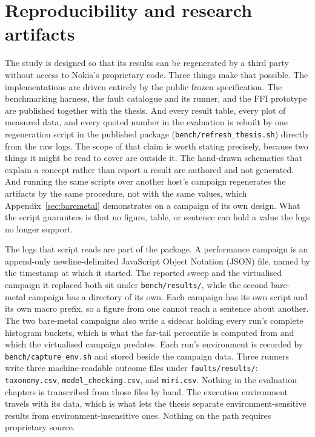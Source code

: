 \documentclass[english,oneside,a4paper,censored,csm,software-track-2020]{HYthesisML}
\begin{document}
\section{Reproducibility and research artifacts}\label{sec:repro}
The study is designed so that its results can be regenerated by a third party without access to
Nokia's proprietary code. Three things make that possible. The implementations are driven
entirely by the public frozen specification. The benchmarking harness, the fault catalogue and
its runner, and the FFI prototype are published together with the thesis. And every result table,
every plot of measured data, and every quoted number in the evaluation is rebuilt by one
regeneration script in the published package (\texttt{bench/refresh\_thesis.sh}) directly from the
raw logs. The scope of that claim is worth stating precisely, because two things it might be read to
cover are outside it. The hand-drawn schematics that explain a concept rather than report a result
are authored and not generated. And running the same scripts over another host's campaign
regenerates the artifacts by the same procedure, not with the same values, which
Appendix~\ref{sec:baremetal} demonstrates on a campaign of its own design. What the script
guarantees is that no figure, table, or sentence can hold a value the logs no longer support.

The logs that script reads are part of the package. A performance campaign is an append-only
newline-delimited JavaScript Object Notation (JSON) file, named by the timestamp at which it
started. The reported sweep and
the virtualised campaign it replaced both sit under \texttt{bench/results/}, while the second
bare-metal campaign has a directory of its own. Each campaign has its own script and its own
macro prefix, so a figure from one cannot reach a sentence about another. The two bare-metal
campaigns also write a sidecar holding every run's complete histogram buckets, which is what the
far-tail percentile is computed from and which the virtualised campaign predates. Each run's
environment is recorded by \texttt{bench/capture\_env.sh} and stored beside the campaign data.
Three runners write three machine-readable outcome files under \texttt{faults/results/}:
\texttt{taxonomy.csv}, \texttt{model\_checking.csv}, and \texttt{miri.csv}. Nothing in the
evaluation chapters is transcribed from those files by hand. The execution environment travels
with its data, which is what lets the thesis separate environment-sensitive results from
environment-insensitive ones. Nothing on the path requires proprietary source.
\end{document}
